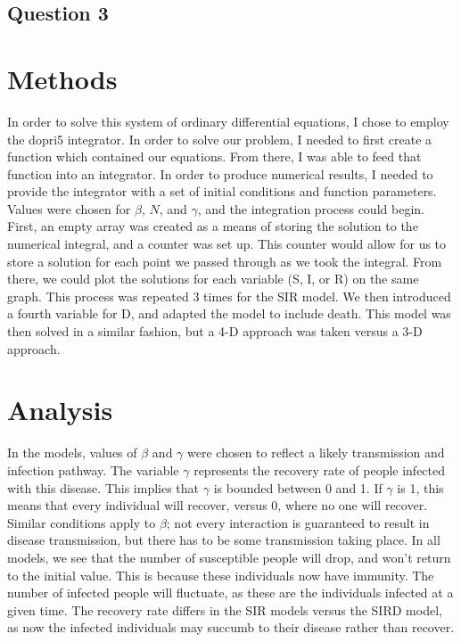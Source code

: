 \documentclass{article}
\begin{document}
\newpage

\begin{center}
    \section*{Question 3}
\end{center}

\section*{Methods}

In order to solve this system of ordinary differential equations, I chose to employ the dopri5 integrator. In order to solve our problem, I needed to first create a function which contained our equations. From there, I was able to feed that function into an integrator. In order to produce numerical results, I needed to provide the integrator with a set of initial conditions and function parameters. Values were chosen for $\beta$, $N$, and $\gamma$, and the integration process could begin. First, an empty array was created as a means of storing the solution to the numerical integral, and a counter was set up. This counter would allow for us to store a solution for each point we passed through as we took the integral. From there, we could plot the solutions for each variable (S, I, or R) on the same graph. This process was repeated 3 times for the SIR model. We then introduced a fourth variable for D, and adapted the model to include death. This model was then solved in a similar fashion, but a 4-D approach was taken versus a 3-D approach.

\section*{Analysis}

In the models, values of $\beta$ and $\gamma$ were chosen to reflect a likely transmission and infection pathway. The variable $\gamma$ represents the recovery rate of people infected with this disease. This implies that $\gamma$ is bounded between 0 and 1. If $\gamma$ is 1, this means that every individual will recover, versus 0, where no one will recover. Similar conditions apply to $\beta$; not every interaction is guaranteed to result in disease transmission, but there has to be some transmission taking place. In all models, we see that the number of susceptible people will drop, and won't return to the initial value. This is because these individuals now have immunity. The number of infected people will fluctuate, as these are the individuals infected at a given time. The recovery rate differs in the SIR models versus the SIRD model, as now the infected individuals may succumb to their disease rather than recover. 
\end{document}

